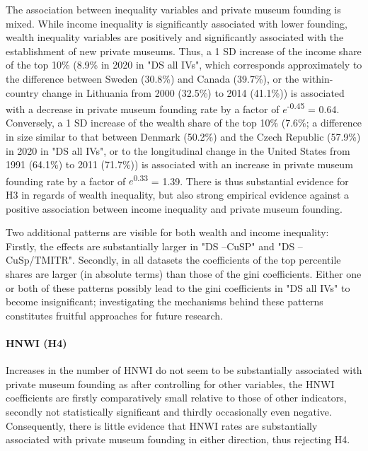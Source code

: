 \documentclass[11pt]{article}
\begin{document}
The association between inequality variables and private museum founding is mixed.
While income inequality is significantly associated with lower founding, wealth inequality variables are positively and significantly associated with the establishment of new private museums. 
Thus, a 1 SD increase of the income share of the top 10\% (8.9\% in 2020 in "DS all IVs", which corresponds approximately to the difference between Sweden (30.8\%) and Canada (39.7\%), or the within-country change in Lithuania from 2000 (32.5\%) to 2014 (41.1\%)) is associated with a decrease in private museum founding rate by a factor of \(e\)\textsuperscript{-0.45} = 0.64. 
Conversely, a 1 SD increase of the wealth share of the top 10\% (7.6\%; a difference in size similar to that between Denmark (50.2\%) and the Czech Republic (57.9\%) in 2020 in "DS all IVs", or to the longitudinal change in the United States from 1991 (64.1\%) to 2011 (71.7\%)) is associated with an increase in private museum founding rate by a factor of \(e\)\textsuperscript{0.33} = 1.39.
There is thus substantial evidence for H3 in regards of wealth inequality, but also strong empirical evidence against a positive association between income inequality and private museum founding. 


Two additional patterns are visible for both wealth and income inequality: 
Firstly, the effects are substantially larger in "DS --CuSP" and "DS --CuSp/TMITR".
Secondly, in all datasets the coefficients of the top percentile shares are larger (in absolute terms) than those of the gini coefficients.
Either one or both of these patterns possibly lead to the gini coefficients in "DS all IVs" to become insignificant; investigating the mechanisms behind these patterns constitutes fruitful approaches for future research. 



\paragraph*{HNWI (H4)}


Increases in the number of HNWI do not seem to be substantially associated with private museum founding as after controlling for other variables, the HNWI coefficients are firstly comparatively small relative to those of other indicators, secondly not statistically significant and thirdly occasionally even negative. 
Consequently, there is little evidence that HNWI rates are substantially associated with private museum founding in either direction, thus rejecting H4. 
\end{document}
